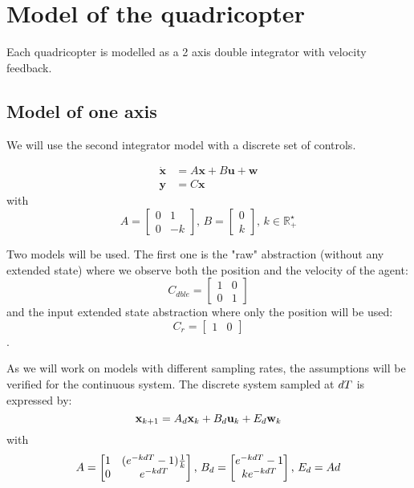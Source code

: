 \section{Model of the quadricopter}
Each quadricopter is modelled as a 2 axis double integrator with velocity feedback.

\subsection{Model of one axis}
We will use the second integrator model with a discrete set of controls.

\begin{equation}\label{eqn:lin_sys}
\begin{split}
\dot{\mathbf{x}} &= A \mathbf{x} + B \mathbf{u} + \mathbf{w}\\
\mathbf{y} &= C\mathbf{x}
\end{split}
\end{equation}
with
\begin{equation*} \label{eqn:sec_int}
A = \begin{bmatrix}
0 & 1\\ 
0 & -k
\end{bmatrix}
\textrm{, }
B = \begin{bmatrix}
0 \\ 
k 
\end{bmatrix}
\textrm{, }
k \in \mathbb{R}_+^\star
\end{equation*}

Two models will be used. The first one is the "raw" abstraction (without any extended state) where we observe both the position and the velocity of the agent:
\begin{equation}
C_{dble} = \begin{bmatrix}
1 & 0\\
0 & 1
\end{bmatrix}
\end{equation}
and the input extended state abstraction where only the position will be used:
\begin{equation}
 C_r = \begin{bmatrix}
 1 & 0
 \end{bmatrix}
\end{equation}.


As we will work on models with different sampling rates, the assumptions will be verified for the continuous system.
The discrete system sampled at $dT$ is expressed by:
\begin{equation}
 \mathbf{x}_{k+1} = A_d  \mathbf{x}_k + B_d  \mathbf{u}_k + E_d  \mathbf{w}_k
\end{equation}
with
\begin{equation*} \label{eqn:sec_int_disc}
A = \begin{bmatrix}
1 & (e^{-k dT} - 1)\frac{1}{k}\\ 
0 & e^{-kdT}
\end{bmatrix}
\textrm{, }
B_d = \begin{bmatrix}
e^{-k dT} - 1 \\ 
k e^{-k dT}
\end{bmatrix}
\textrm{, }
E_d = Ad
\end{equation*}


